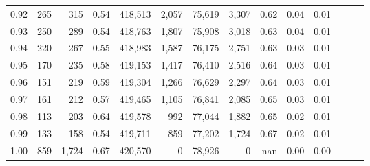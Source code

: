 \begin{tabular}{rrrrrrrrrrrrrr}
0.92 &    265 &    315 &  0.54 &  418,513 &    2,057 &  75,619 &   3,307 &  0.62 &  0.04 &      0.01 \\
0.93 &    250 &    289 &  0.54 &  418,763 &    1,807 &  75,908 &   3,018 &  0.63 &  0.04 &      0.01 \\
0.94 &    220 &    267 &  0.55 &  418,983 &    1,587 &  76,175 &   2,751 &  0.63 &  0.03 &      0.01 \\
0.95 &    170 &    235 &  0.58 &  419,153 &    1,417 &  76,410 &   2,516 &  0.64 &  0.03 &      0.01 \\
0.96 &    151 &    219 &  0.59 &  419,304 &    1,266 &  76,629 &   2,297 &  0.64 &  0.03 &      0.01 \\
0.97 &    161 &    212 &  0.57 &  419,465 &    1,105 &  76,841 &   2,085 &  0.65 &  0.03 &      0.01 \\
0.98 &    113 &    203 &  0.64 &  419,578 &      992 &  77,044 &   1,882 &  0.65 &  0.02 &      0.01 \\
0.99 &    133 &    158 &  0.54 &  419,711 &      859 &  77,202 &   1,724 &  0.67 &  0.02 &      0.01 \\
1.00 &    859 &  1,724 &  0.67 &  420,570 &        0 &  78,926 &       0 &   nan &  0.00 &      0.00 \\
\bottomrule
\end{tabular}
